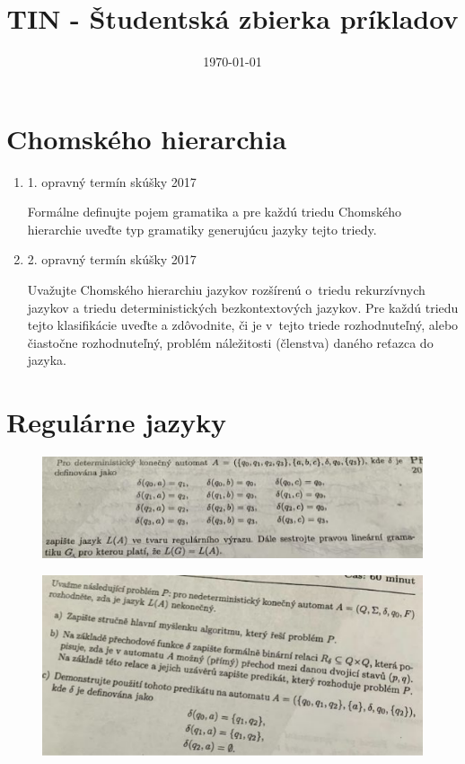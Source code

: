 \documentclass[]{article}
\begin{document}
	
	
	\title{TIN - Študentská zbierka príkladov}
	\date{\today}
	
	\maketitle
	\newpage
	\tableofcontents
	\newpage
	
	\section{Chomského hierarchia}
	
	\begin{enumerate}
		\item 1. opravný termín skúšky 2017
		
		Formálne definujte pojem gramatika a pre každú triedu Chomského hierarchie uveďte typ gramatiky generujúcu jazyky tejto triedy.
		
		\item 2. opravný termín skúšky 2017
		
		Uvažujte Chomského hierarchiu jazykov rozšírenú o~triedu rekurzívnych jazykov a triedu deterministických bezkontextových jazykov. Pre každú triedu tejto klasifikácie uveďte a zdôvodnite, či je v~tejto triede rozhodnuteľný, alebo čiastočne rozhodnuteľný, problém náležitosti (členstva) daného reťazca do jazyka.
	\end{enumerate}

	\section{Regulárne jazyky}
	
	\begin{figure}[H]
		\includegraphics[width=\textwidth]{tasks/regularne/task1.png}
	\end{figure}
	
	\begin{figure}[H]
		\includegraphics[width=\textwidth]{tasks/regularne/task2.png}
	\end{figure}
	
\end{document}
